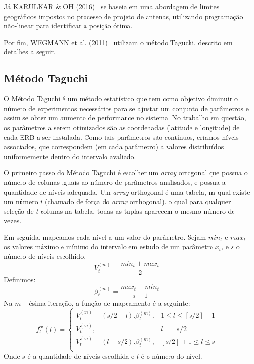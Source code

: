 \documentclass[]{politex}
\begin{document}
Já KARULKAR \& OH (2016)~\cite{nao-linear} se baseia em uma abordagem de limites
geográficos impostos no processo de projeto de antenas, utilizando programação
não-linear para identificar a posição ótima.

Por fim, WEGMANN et al. (2011)~\cite{taguchi} utilizam o método Taguchi,
descrito em detalhes a seguir.

\subsection{Método Taguchi}

O Método Taguchi é um método estatístico que tem como objetivo diminuir o número
de experimentos necessários para se ajustar um conjunto de parâmetros e assim
se obter um aumento de performance no sistema. No trabalho em questão, os
parâmetros a serem otimizados são as coordenadas (latitude e longitude) de cada
ERB a ser instalada. Como tais parâmetros são contínuos, criamos níveis
associados, que correspondem (em cada parâmetro) a valores distribuídos
uniformemente dentro do intervalo avaliado.

O primeiro passo do Método Taguchi é escolher um \textit{array} ortogonal que possua o
número de colunas iguais ao número de parâmetros analisados, e possua a
quantidade de níveis adequada. Um \textit{array} orthogonal é uma tabela, na qual existe um
número $t$ (chamado de força do \textit{array} orthogonal), o qual para qualquer seleção de
$t$ colunas na tabela, todas as tuplas aparecem o mesmo número de vezes.

Em seguida, mapeamos cada nível a um valor do parâmetro. Sejam $min_t$ e $max_t$
os valores máximo e mínimo do intervalo em estudo de um parâmetro $x_t$, e $s$ o
número de níveis escolhido.
\begin{equation*}
    V_t^{(m)}=\frac{min_t+max_t}{2}
\end{equation*}
Definimos:
\begin{equation*}
    \beta_t^{(m)} = \frac{max_t-min_t}{s+1}
\end{equation*}
Na $m-$ésima iteração, a função de mapeamento é a seguinte:
\begin{equation*}
    f_t^m(l) =
    \begin{cases}
        V_t^{(m)} - (s/2 - l).\beta_t^{(m)}, & 1 \leq l \leq [s/2] - 1 \\
        V_t^{(m)}, &  l = [s/2]\\
        V_t^{(m)} + (l - s/2).\beta_t^{(m)}, & [s/2] + 1 \leq l \leq s \\
    \end{cases}
\end{equation*}
Onde $s$ é a quantidade de níveis escolhida e $l$ é o número do nível.
\end{document}
